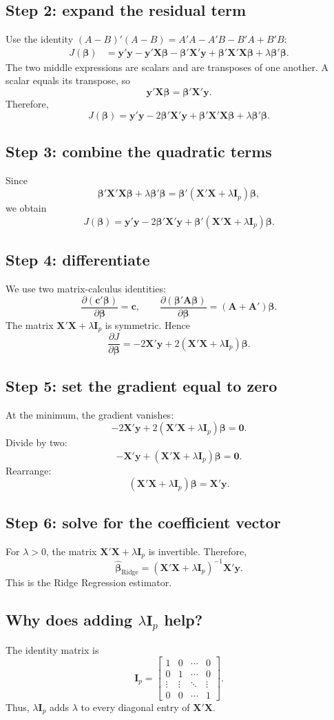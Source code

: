 \documentclass[11pt,a4paper]{article}
\numberwithin{equation}{section}
\theoremstyle{remark}
\newcommand{\X}{\mathbf X}
\newcommand{\y}{\mathbf y}
\newcommand{\I}{\mathbf I}
\newcommand{\bta}{\boldsymbol{\beta}}
\newcommand{\bhat}{\widehat{\boldsymbol{\beta}}}
\begin{document}
\subsection{Step 2: expand the residual term}
Use the identity $(A-B)'(A-B)=A'A-A'B-B'A+B'B$:
\[
\begin{aligned}
J(\bta)
&=\y'\y-\y'\X\bta-\bta'\X'\y
+\bta'\X'\X\bta+\lambda\bta'\bta.
\end{aligned}
\]
The two middle expressions are scalars and are transposes of one another.
A scalar equals its transpose, so
\[
\y'\X\bta=\bta'\X'\y.
\]
Therefore,
\[
J(\bta)=\y'\y-2\bta'\X'\y+
\bta'\X'\X\bta+\lambda\bta'\bta.
\]

\subsection{Step 3: combine the quadratic terms}
Since
\[
\bta'\X'\X\bta+\lambda\bta'\bta
=\bta'(\X'\X+\lambda\I_p)\bta,
\]
we obtain
\[
J(\bta)=\y'\y-2\bta'\X'\y+
\bta'(\X'\X+\lambda\I_p)\bta.
\]

\subsection{Step 4: differentiate}
We use two matrix-calculus identities:
\[
\frac{\partial(\mathbf c'\bta)}{\partial\bta}=\mathbf c,
\qquad
\frac{\partial(\bta'\mathbf A\bta)}{\partial\bta}
=(\mathbf A+\mathbf A')\bta.
\]
The matrix $\X'\X+\lambda\I_p$ is symmetric. Hence
\[
\frac{\partial J}{\partial\bta}
=-2\X'\y+2(\X'\X+\lambda\I_p)\bta.
\]

\subsection{Step 5: set the gradient equal to zero}
At the minimum, the gradient vanishes:
\[
-2\X'\y+2(\X'\X+\lambda\I_p)\bta=\mathbf 0.
\]
Divide by two:
\[
-\X'\y+(\X'\X+\lambda\I_p)\bta=\mathbf 0.
\]
Rearrange:
\[
(\X'\X+\lambda\I_p)\bta=\X'\y.
\]

\subsection{Step 6: solve for the coefficient vector}
For $\lambda>0$, the matrix $\X'\X+\lambda\I_p$ is invertible. Therefore,
\[
\boxed{
\bhat_{\mathrm{Ridge}}
=(\X'\X+\lambda\I_p)^{-1}\X'\y.
}
\]
This is the Ridge Regression estimator.

\subsection{Why does adding \texorpdfstring{$\lambda\I_p$}{lambda I\_p} help?}
The identity matrix is
\[
\I_p=
\begin{bmatrix}
1&0&\cdots&0\\
0&1&\cdots&0\\
\vdots&\vdots&\ddots&\vdots\\
0&0&\cdots&1
\end{bmatrix}.
\]
Thus, $\lambda\I_p$ adds $\lambda$ to every diagonal entry of $\X'\X$.
\end{document}
